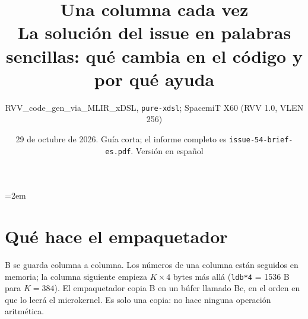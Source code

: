 
\graphicspath{{issue-54-figs/simple/es/}}
\renewcommand{\figurename}{Figura}
\emergencystretch=2em
\title{\vspace{-1.2cm}\textbf{Una columna cada vez}\\[2pt]\large La solución del issue  en palabras sencillas: qué cambia en el código y por qué ayuda}
\author{RVV\_code\_gen\_via\_MLIR\_xDSL, \texttt{pure-xdsl}; SpacemiT X60 (RVV 1.0, VLEN 256)}
\date{29 de octubre de 2026. Guía corta; el informe completo es \texttt{issue-54-brief-es.pdf}. Versión en español}

\maketitle\vspace{-1.5ex}


\section{Qué hace el empaquetador}
B se guarda columna a columna. Los números de una columna están seguidos en memoria; la columna siguiente empieza $K\times4$ bytes más allá
(\texttt{ldb*4} = 1536 B para $K=384$). El empaquetador copia B en un búfer llamado Bc, en el orden en que lo leerá el microkernel. Es solo una
copia: no hace ninguna operación aritmética.

